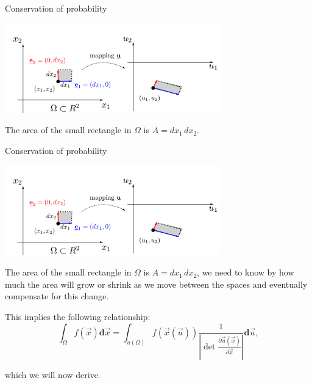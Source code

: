 \begin{frame}{Conservation of probability}

\begin{center}
\includegraphics[width=0.7\textwidth]{img/u}
\end{center}

The area of the small rectangle in $\Omega$ is $A = dx_1\, dx_2$.\\

\end{frame}


\begin{frame}{Conservation of probability}

\begin{center}
\includegraphics[width=0.7\textwidth]{img/u}
\end{center}

The area of the small rectangle in $\Omega$ is $A = dx_1\, dx_2$, we need to know by how much the area will grow or shrink as we move between the spaces and eventually compensate for this change.

\pause

This implies the following relationship:
\begin{equation}
\int_{\Omega} f(\vec{x}) \mathbf{d}\vec{x}
=\int_{u(\Omega)} f({\vec x(\vec u)}) \frac{1}{\left|\det \frac{\partial \vec{u}(\vec{x})}{\partial \vec{x}} \right|} \mathbf{d}\vec{u},
\end{equation}

which we will now derive.

\end{frame}

